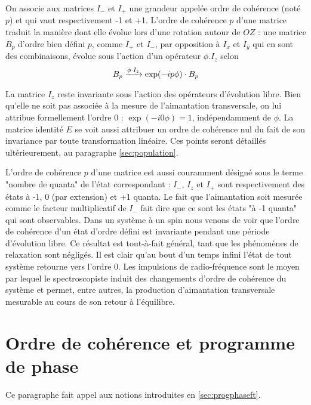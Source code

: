 On associe aux matrices $I_-$ et $I_+$ une grandeur appelée ordre de 
cohérence (noté $p$) et qui vaut respectivement -1 et +1. 
L'ordre de cohérence $p$ d'une matrice traduit la manière 
dont elle évolue lors d'une rotation autour de $OZ$ : 
une matrice $B_p$ d'ordre bien défini $p$, comme $I_+$ et $I_-$, 
par opposition à $I_x$ et $I_y$ qui en sont des combinaisons,
évolue sous l'action d'un opérateur $\phi . I_z$ selon
\begin{equation}
B_p \xrightarrow{\phi \cdot I_z} \exp(-i p \phi) \cdot B_p
\end{equation}

La matrice $I_z$ reste invariante sous l'action des opérateurs d'évolution libre. 
Bien qu'elle ne soit pas associée à la mesure de l'aimantation transversale, on lui attribue 
formellement l'ordre 0 : $\exp(-i 0 \phi) = 1$, indépendamment de $\phi$.
La matrice identité $E$ se voit aussi attribuer un ordre de cohérence nul
du fait de son invariance par toute transformation linéaire.
Ces points seront détaillés ultérieurement, au paragraphe \ref{sec:population}.

L'ordre de cohérence $p$ d'une matrice est aussi couramment désigné sous le
terme "nombre de quanta" de l'état correspondant : 
$I_-$, $I_z$ et $I_+$ sont respectivement des états à -1, 0 (par extension) et +1 quanta.
Le fait que l'aimantation soit mesurée comme le facteur multiplicatif de $I_-$
fait dire que ce sont les états "à -1 quanta" qui sont observables.
Dans un système à un spin nous venons de voir que l'ordre
de cohérence d'un état d'ordre défini est invariante pendant une période
d'évolution libre.
Ce résultat est tout-à-fait général, tant que les phénomènes de relaxation
sont négligés.
Il est clair qu'au bout d'un temps infini l'état de tout système retourne vers
l'ordre 0.
Les impulsions de radio-fréquence sont le moyen par lequel le spectroscopiste
induit des changements d'ordre de cohérence du système et permet, entre autres,
la production d'aimantation transversale mesurable au cours de son retour à
l'équilibre.

\section{Ordre de cohérence et programme de phase}
\label{sec:progphasedensite}
Ce paragraphe fait appel aux notions introduites en \ref{sec:progphaseft}.

